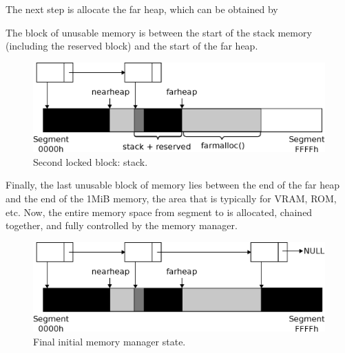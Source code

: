 \documentclass[book.tex]{subfiles}
\begin{document}
The next step is allocate the far heap, which can be obtained by\\

\par

\par 

The block of unusable memory is between the start of the stack memory (including the reserved block) and the start of the far heap. \\

\begin{figure}[H]
\centering
 \includegraphics[width=\textwidth]{imgs/drawings/mm_stack.eps}
 \caption{Second locked block: stack.}
 \end{figure}
 \par

\par
Finally, the last unusable block of memory lies between the end of the far heap and the end of the 1MiB memory, the area that is typically for VRAM, ROM, etc. Now, the entire memory space from segment  to  is allocated, chained together, and fully controlled by the memory manager.\\

\begin{figure}[H]
\centering
 \includegraphics[width=\textwidth]{imgs/drawings/mm_final.eps}
 \caption{Final initial memory manager state.}
 \end{figure}
\end{document}
